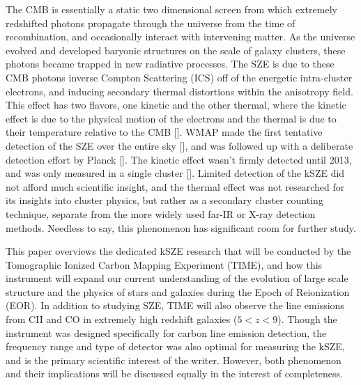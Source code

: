 \documentclass[manuscript]{aastex}
\begin{document}
 The CMB is essentially a static two dimensional screen from which extremely redshifted photons propagate through the universe from the time of recombination, and occasionally interact with intervening matter. As the universe evolved and developed baryonic structures on the scale of galaxy clusters, these photons became trapped in new radiative processes. The SZE is due to these CMB photons inverse Compton Scattering (ICS) off of the energetic intra-cluster electrons, and inducing secondary thermal distortions within the anisotropy field. This effect has two flavors, one kinetic and the other thermal, where the kinetic effect is due to the physical motion of the electrons and the thermal is due to their temperature relative to the CMB [\cite{Sunyaev1970}]. WMAP made the first tentative detection of the SZE over the entire sky [\cite{Bond2003}], and was followed up with a deliberate detection effort by Planck [\cite{Planck2013}]. The kinetic effect wasn't firmly detected until 2013, and was only measured in a single cluster [\cite{Sayers2013}]. Limited detection of the kSZE did not afford much scientific insight, and the thermal effect was not researched for its insights into cluster physics, but rather as a secondary cluster counting technique, separate from the more widely used far-IR or X-ray detection methods. Needless to say, this phenomenon has significant room for further study.
 
This paper overviews the dedicated kSZE research that will be conducted by the Tomographic Ionized Carbon Mapping Experiment (TIME), and how this instrument will expand our current understanding of the evolution of large scale structure and the physics of stars and galaxies during the Epoch of Reionization (EOR). In addition to studying SZE, TIME will also observe the line emissions from CII and CO in extremely high redshift galaxies ($5 < z < 9$). Though the instrument was designed specifically for carbon line emission detection, the frequency range and type of detector was also optimal for measuring the kSZE, and is the primary scientific interest of the writer. However, both phenomenon and their implications will be discussed equally in the interest of completeness. 
\end{document}
